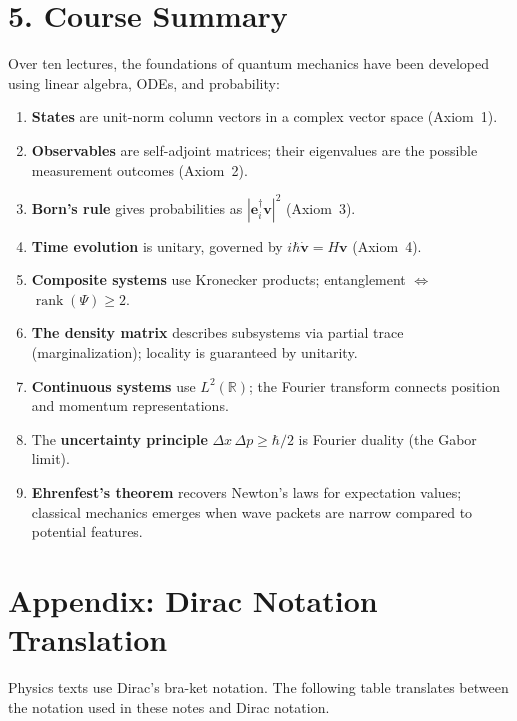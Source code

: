 \documentclass[12pt,a4paper]{article}
\begin{document}
\section{5. Course Summary}

Over ten lectures, the foundations of quantum mechanics have been developed using linear algebra, ODEs, and probability:

\begin{enumerate}[nosep]
    \item \textbf{States} are unit-norm column vectors in a complex vector space (Axiom~1).
    \item \textbf{Observables} are self-adjoint matrices; their eigenvalues are the possible measurement outcomes (Axiom~2).
    \item \textbf{Born's rule} gives probabilities as $|\mathbf{e}_i^\dagger\mathbf{v}|^2$ (Axiom~3).
    \item \textbf{Time evolution} is unitary, governed by $i\hbar\dot{\mathbf{v}} = H\mathbf{v}$ (Axiom~4).
    \item \textbf{Composite systems} use Kronecker products; entanglement $\Leftrightarrow$ $\operatorname{rank}(\Psi) \geq 2$.
    \item \textbf{The density matrix} describes subsystems via partial trace (marginalization); locality is guaranteed by unitarity.
    \item \textbf{Continuous systems} use $L^2(\mathbb{R})$; the Fourier transform connects position and momentum representations.
    \item The \textbf{uncertainty principle} $\Delta x\,\Delta p\geq\hbar/2$ is Fourier duality (the Gabor limit).
    \item \textbf{Ehrenfest's theorem} recovers Newton's laws for expectation values; classical mechanics emerges when wave packets are narrow compared to potential features.
\end{enumerate}

\newpage
\appendix
\section*{Appendix: Dirac Notation Translation}

Physics texts use Dirac's bra-ket notation.  The following table translates between the notation used in these notes and Dirac notation.
\end{document}
